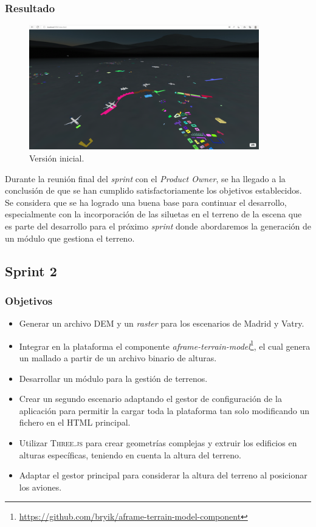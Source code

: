 \documentclass[a4paper, 11pt]{book}
\begin{document}
\subsubsection{Resultado}
\begin{figure}[h]
  \centering
  \includegraphics[width=10cm, keepaspectratio]{img/Sprint1.png}
  \caption{Versión inicial.}
  \label{fig:sprint1}
\end{figure}
Durante la reunión final del \emph{sprint} con el \emph{Product Owner}, se ha llegado a la conclusión de que se han cumplido satisfactoriamente los objetivos establecidos. Se considera que se ha logrado una buena base para continuar el desarrollo, especialmente con la incorporación de las siluetas en el terreno de la escena que es parte del desarrollo para el próximo \emph{sprint} donde abordaremos la generación de un módulo que gestiona el terreno.
\subsection{Sprint 2}
\subsubsection{Objetivos}
\begin{itemize}
    \item Generar un archivo \textsc{DEM} y un \emph{\gls{raster}} para los escenarios de Madrid y Vatry.
    \item Integrar en la plataforma el componente \emph{aframe-terrain-model}\footnote{\url{https://github.com/bryik/aframe-terrain-model-component}}, el cual genera un mallado a partir de un archivo binario de alturas.
    \item Desarrollar un módulo para la gestión de terrenos.
    \item Crear un segundo escenario adaptando el gestor de configuración de la aplicación para permitir la cargar toda la plataforma tan solo modificando un fichero en el \textsc{HTML} principal.
    \item Utilizar \textsc{Three.js} para crear geometrías complejas y extruir los edificios en alturas específicas, teniendo en cuenta la altura del terreno.
    \item Adaptar el gestor principal para considerar la altura del terreno al posicionar los aviones.
\end{itemize}
\end{document}
